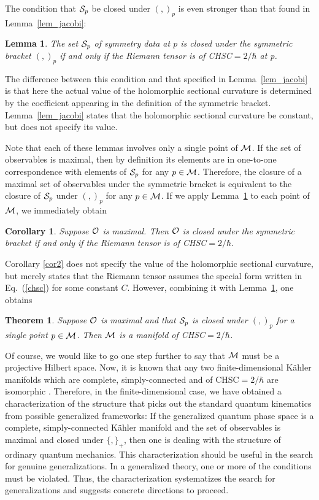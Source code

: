 \documentclass[12pt,aps,eqsecnum,tighten]{revtex4-2}
\newtheorem{theorem}{Theorem}[section]
\newtheorem{lemma}{Lemma}[section]
\def\M{{\cal M}}
\newcommand{\eqn}[1]{Eq.~(\ref{#1})}
\newtheorem{cor}{Corollary}
\begin{document}
The condition that ${\cal S}_p$ be closed under $( , )_p$ is even stronger
than that found in Lemma~\ref{lem_jacobi}:
%
\begin{lemma}\label{lem_sb}
The set ${\cal S}_p$ of symmetry data at $p$ is closed under
the symmetric bracket $( , )_p$ if and only if the Riemann
tensor is of CHSC$=2/\hbar$ at p.
\end{lemma}
%
The difference between this condition and that specified in
Lemma~\ref{lem_jacobi} is that here the actual value of the
holomorphic sectional curvature is determined by the coefficient
appearing in the definition of the symmetric bracket.
Lemma~\ref{lem_jacobi} states that the holomorphic sectional curvature
be constant, but does not specify its value.

Note that each of these lemmas involves only a single point of $\M$.
If the set of observables is maximal, then by definition its elements
are in one-to-one correspondence with elements of ${\cal S}_p$ for any
$p\in\M$.  Therefore, the closure of a maximal set of observables
under the symmetric bracket is equivalent to the closure of ${\cal
S}_p$ under $( , )_p$ for any $p\in\M$.  If we apply
Lemma~\ref{lem_sb} to each point of $\M$, we immediately obtain
%
\begin{cor}
Suppose ${\cal O}$ is maximal.  Then ${\cal O}$ is closed under
the symmetric bracket if and only if the Riemann tensor is
of CHSC$=2/\hbar$.
\end{cor}
%

Corollary \ref{cor2}  does not specify the value of the holomorphic
sectional curvature, but merely states that the Riemann tensor assumes
the special form written in \eqn{chsc} for some constant $C$.  However,
combining it with Lemma~\ref{lem_sb}, one obtains
%
\begin{theorem}
Suppose ${\cal O}$ is maximal and that ${\cal S}_p$ is
closed under $( , )_p$ for a single point $p\in\M$.  Then
$\M$ is a manifold of CHSC$=2/\hbar$.

\end{theorem}

Of course, we would like to go one step further to say that $\M$ must
be a projective Hilbert space. Now, it is known that any two
finite-dimensional K\"ahler manifolds which are complete,
simply-connected and of CHSC$=2/\hbar$ are isomorphic \cite{yano}.
Therefore, in the finite-dimensional case, we have obtained a
characterization of the structure that picks out the standard quantum
kinematics from possible generalized frameworks: If the generalized
quantum phase space is a complete, simply-connected K\"ahler manifold
and the set of observables is maximal and closed under $\{ , \}_+$,
then one is dealing with the structure of ordinary quantum
mechanics. This characterization should be useful in the search for
genuine generalizations. In a generalized theory, one or more of the
conditions must be violated. Thus, the characterization systematizes
the search for generalizations and suggests concrete directions to
proceed.
\end{document}
